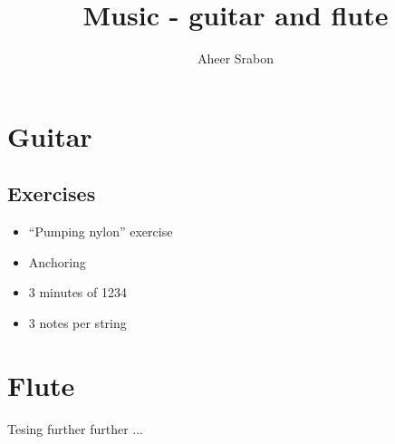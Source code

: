 

\title{Music - guitar and flute}
\author{Aheer Srabon}


\maketitle

\section{Guitar}
\subsection{Exercises}
\begin{itemize}
	\item ``Pumping nylon'' exercise
	\item Anchoring
	\item 3 minutes of 1234
	\item 3 notes per string
\end{itemize}

\section{Flute}
\noindent Tesing further further ...


